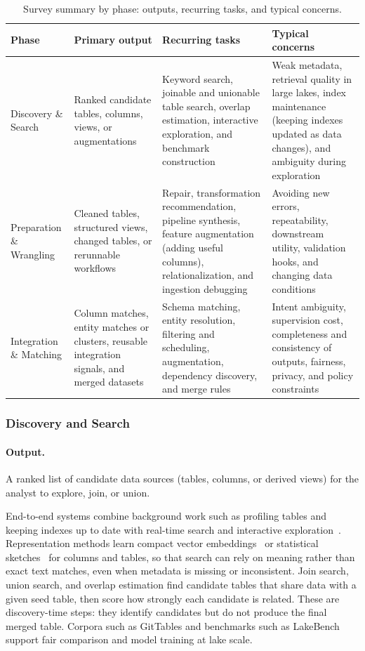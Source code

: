 \documentclass[sigconf]{acmart}
\newcommand{\tbl}{%
  \scriptsize
  \setlength{\tabcolsep}{4pt}%
  \renewcommand{\arraystretch}{1.12}%
}
\begin{document}
\begin{table}[!htbp]
\centering
\caption{Survey summary by phase: outputs, recurring tasks, and typical concerns.}
\label{tab:phase-summary}
\tbl
\begin{tabularx}{\textwidth}{@{}p{30mm}p{34mm}Y p{42mm}@{}}
\toprule
\textbf{Phase} & \textbf{Primary output} & \textbf{Recurring tasks} & \textbf{Typical concerns} \\
\midrule
Discovery \& Search &
Ranked candidate tables, columns, views, or augmentations &
Keyword search, joinable and unionable table search, overlap estimation, interactive exploration, and benchmark construction &
Weak metadata, retrieval quality in large lakes, index maintenance (keeping indexes updated as data changes), and ambiguity during exploration \\
\addlinespace[0.25em]
Preparation \& Wrangling &
Cleaned tables, structured views, changed tables, or rerunnable workflows &
Repair, transformation recommendation, pipeline synthesis, feature augmentation (adding useful columns), relationalization, and ingestion debugging &
Avoiding new errors, repeatability, downstream utility, validation hooks, and changing data conditions \\
\addlinespace[0.25em]
Integration \& Matching &
Column matches, entity matches or clusters, reusable integration signals, and merged datasets &
Schema matching, entity resolution, filtering and scheduling, augmentation, dependency discovery, and merge rules &
Intent ambiguity, supervision cost, completeness and consistency of outputs, fairness, privacy, and policy constraints \\
\bottomrule
\end{tabularx}
\end{table}

\subsubsection{Discovery and Search}
\paragraph{Output.} A ranked list of candidate data sources (tables, columns, or derived views) for the analyst to explore, join, or union.

End-to-end systems combine background work such as profiling tables and keeping indexes up to date with real-time search and interactive exploration~\cite{10.14778/3685800.3685880,11112882,10.14778/3659437.3659461}.
Representation methods learn compact vector embeddings~\cite{10.14778/3587136.3587146,11113165} or statistical sketches~\cite{11113110} for columns and tables, so that search can rely on meaning rather than exact text matches, even when metadata is missing or inconsistent.
Join search, union search, and overlap estimation find candidate tables that share data with a given seed table, then score how strongly each candidate is related. These are discovery-time steps: they identify candidates but do not produce the final merged table.
Corpora such as GitTables and benchmarks such as LakeBench~\cite{10.14778/3659437.3659448} support fair comparison and model training at lake scale.
\end{document}
